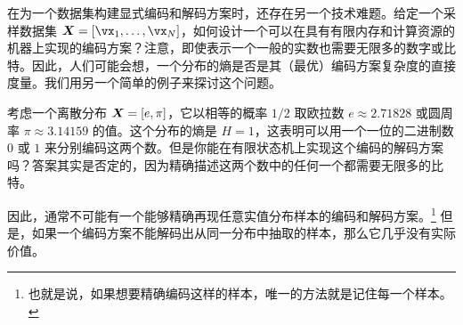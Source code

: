 \documentclass[../../book-main.tex]{subfiles}
\begin{document}




在为一个数据集构建显式编码和解码方案时，还存在另一个技术难题。给定一个采样数据集 $\X = [\vx_1, \ldots, \vx_N]$，如何设计一个可以在具有有限内存和计算资源的机器上实现的编码方案？注意，即使表示一个一般的实数也需要无限多的数字或比特。因此，人们可能会想，一个分布的熵是否是其（最优）编码方案复杂度的直接度量。我们用另一个简单的例子来探讨这个问题。
\begin{example}[精度] \label{eg:two-inrational}
	考虑一个离散分布 $\bm{X} = [e, \pi]$，它以相等的概率 $1/2$ 取欧拉数 $e \approx 2.71828$ 或圆周率 $\pi \approx 3.14159$ 的值。这个分布的熵是 $H =1$，这表明可以用一个一位的二进制数 $0$ 或 $1$ 来分别编码这两个数。但是你能在有限状态机上实现这个编码的解码方案吗？答案其实是否定的，因为精确描述这两个数中的任何一个都需要无限多的比特。
\end{example}

因此，通常不可能有一个能够精确再现任意实值分布样本的编码和解码方案。\footnote{也就是说，如果想要精确编码这样的样本，唯一的方法就是记住每一个样本。} 但是，如果一个编码方案不能解码出从同一分布中抽取的样本，那么它几乎没有实际价值。
\end{document}
